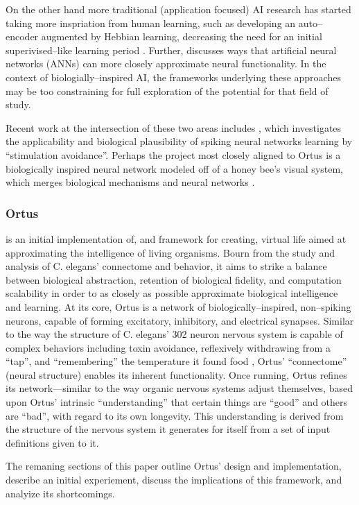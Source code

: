 \documentclass[letterpaper]{article}
\begin{document}
On the other hand more traditional (application focused) AI research has started taking more inspriation from human learning, such as developing an auto--encoder augmented by Hebbian learning, decreasing the need for an initial superivised--like learning period \citep{Bowren2016}. Further, \citet{Marblestone2016} discusses ways that artificial neural networks (ANNs) can more closely approximate neural functionality.
In the context of biologially--inspired AI, the frameworks underlying these approaches may be too constraining for full exploration of the potential for that field of study. 

Recent work at the intersection of these two areas includes \citet{Sinapayen2016}, which investigates the applicability and biological plausibility of spiking neural networks learning by ``stimulation avoidance''. Perhaps the project most closely aligned to Ortus is a biologically inspired neural network modeled off of a honey bee's visual system, which merges biological mechanisms and neural networks \citep{Roper2017}.


\subsubsection{Ortus} is an initial implementation of, and framework for creating, virtual life aimed at approximating the intelligence of living organisms.
Bourn from the study and analysis of C. elegans' connectome and behavior, it aims to strike a balance between biological abstraction, retention of biological fidelity, and computation scalability in order to as closely as possible approximate biological intelligence and learning.
At its core, Ortus is a network of biologically--inspired, non--spiking neurons, capable of forming excitatory, inhibitory, and electrical synapses.
Similar to the way the structure of C. elegans' 302 neuron nervous system is capable of complex behaviors including toxin avoidance, reflexively withdrawing from a ``tap'', and ``remembering'' the temperature it found food  \citep{Jarrell2012}, Ortus' ``connectome'' (neural structure) enables its inherent functionality.
Once running, Ortus refines its network---similar to the way organic nervous systems adjust themselves, based upon Ortus' intrinsic ``understanding'' that certain things are ``good'' and others are ``bad'', with regard to its own longevity.
This understanding is derived from the structure of the nervous system it generates for itself from a set of input definitions given to it.


The remaning sections of this paper outline Ortus' design and implementation, describe an initial experiement, discuss the implications of this framework, and analyize its shortcomings.
\end{document}
